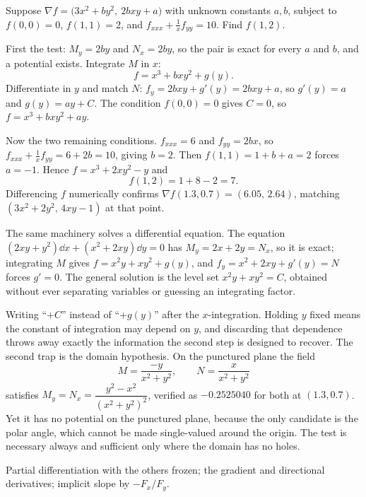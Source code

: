 \begin{worked}
Suppose $\nabla f=\bigl(3x^{2}+by^{2},\ 2bxy+a\bigr)$ with unknown constants $a,b$, subject to $f(0,0)=0$, $f(1,1)=2$, and $f_{xxx}+\tfrac1x f_{yy}=10$. Find $f(1,2)$.

First the test: $M_{y}=2by$ and $N_{x}=2by$, so the pair is exact for every $a$ and $b$, and a potential exists. Integrate $M$ in $x$:
\[
f=x^{3}+bxy^{2}+g(y).
\]
Differentiate in $y$ and match $N$: $f_{y}=2bxy+g'(y)=2bxy+a$, so $g'(y)=a$ and $g(y)=ay+C$. The condition $f(0,0)=0$ gives $C=0$, so $f=x^{3}+bxy^{2}+ay$.

Now the two remaining conditions. $f_{xxx}=6$ and $f_{yy}=2bx$, so $f_{xxx}+\tfrac1x f_{yy}=6+2b=10$, giving $b=2$. Then $f(1,1)=1+b+a=2$ forces $a=-1$. Hence $f=x^{3}+2xy^{2}-y$ and
\[
f(1,2)=1+8-2=7 .
\]
Differencing $f$ numerically confirms $\nabla f(1.3,0.7)=(6.05,\,2.64)$, matching $(3x^{2}+2y^{2},\,4xy-1)$ at that point.

The same machinery solves a differential equation. The equation $(2xy+y^{2})\dd x+(x^{2}+2xy)\dd y=0$ has $M_{y}=2x+2y=N_{x}$, so it is exact; integrating $M$ gives $f=x^{2}y+xy^{2}+g(y)$, and $f_{y}=x^{2}+2xy+g'(y)=N$ forces $g'=0$. The general solution is the level set $x^{2}y+xy^{2}=C$, obtained without ever separating variables or guessing an integrating factor.
\end{worked}

\begin{trap}
Writing ``$+C$'' instead of ``$+g(y)$'' after the $x$-integration. Holding $y$ fixed means the constant of integration may depend on $y$, and discarding that dependence throws away exactly the information the second step is designed to recover. The second trap is the domain hypothesis. On the punctured plane the field
\[
M=\frac{-y}{x^{2}+y^{2}},\qquad N=\frac{x}{x^{2}+y^{2}}
\]
satisfies $M_{y}=N_{x}=\dfrac{y^{2}-x^{2}}{(x^{2}+y^{2})^{2}}$, verified as $-0.2525040$ for both at $(1.3,0.7)$. Yet it has no potential on the punctured plane, because the only candidate is the polar angle, which cannot be made single-valued around the origin. The test is necessary always and sufficient only where the domain has no holes.
\end{trap}

\begin{seealsob}Partial differentiation with the others frozen; the gradient and directional derivatives; implicit slope by $-F_{x}/F_{y}$.\end{seealsob}

